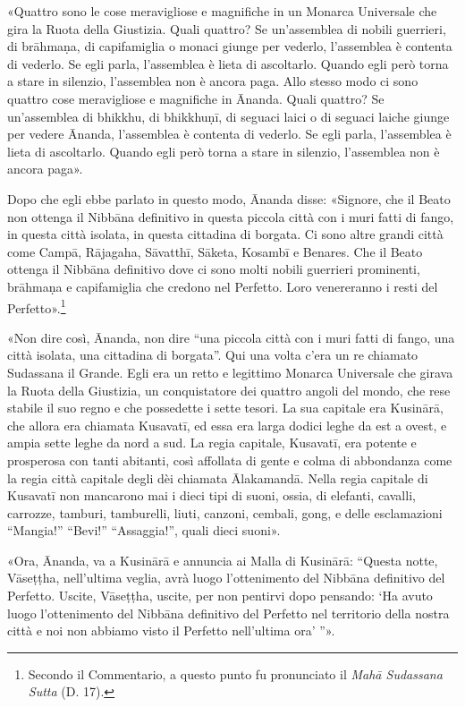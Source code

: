 

«Quattro sono le cose meravigliose e magnifiche in un Monarca Universale
che gira la Ruota della Giustizia. Quali quattro? Se un’assemblea di
nobili guerrieri, di brāhmaṇa, di capifamiglia o monaci giunge per
vederlo, l’assemblea è contenta di vederlo. Se egli parla, l’assemblea è
lieta di ascoltarlo. Quando egli però torna a stare in silenzio,
l’assemblea non è ancora paga. Allo stesso modo ci sono quattro cose
meravigliose e magnifiche in Ānanda. Quali quattro? Se un’assemblea di
bhikkhu, di bhikkhuṇī, di seguaci laici o di seguaci laiche giunge per
vedere Ānanda, l’assemblea è contenta di vederlo. Se egli parla,
l’assemblea è lieta di ascoltarlo. Quando egli però torna a stare in
silenzio, l’assemblea non è ancora paga».




Dopo che egli ebbe parlato in questo modo, Ānanda disse: «Signore, che
il Beato non ottenga il Nibbāna definitivo in questa piccola città con i
muri fatti di fango, in questa città isolata, in questa cittadina di
borgata. Ci sono altre grandi città come Campā, Rājagaha, Sāvatthī,
Sāketa, Kosambī e Benares. Che il Beato ottenga il Nibbāna definitivo
dove ci sono molti nobili guerrieri prominenti, brāhmaṇa e capifamiglia
che credono nel Perfetto. Loro venereranno i resti del
Perfetto».\footnote{Secondo il Commentario, a questo punto fu pronunciato il \emph{Mahā Sudassana Sutta} (D. 17).}


«Non dire così, Ānanda, non dire “una piccola città con i muri fatti di
fango, una città isolata, una cittadina di borgata”. Qui una volta c’era
un re chiamato Sudassana il Grande. Egli era un retto e legittimo
Monarca Universale che girava la Ruota della Giustizia, un conquistatore
dei quattro angoli del mondo, che rese stabile il suo regno e che
possedette i sette tesori. La sua capitale era Kusinārā, che allora era
chiamata Kusavatī, ed essa era larga dodici leghe da est a ovest, e
ampia sette leghe da nord a sud. La regia capitale, Kusavatī, era
potente e prosperosa con tanti abitanti, così affollata di gente e colma
di abbondanza come la regia città capitale degli dèi chiamata
Ālakamandā. Nella regia capitale di Kusavatī non mancarono mai i dieci
tipi di suoni, ossia, di elefanti, cavalli, carrozze, tamburi,
tamburelli, liuti, canzoni, cembali, gong, e delle esclamazioni
“Mangia!” “Bevi!” “Assaggia!”, quali dieci suoni».




«Ora, Ānanda, va a Kusinārā e annuncia ai Malla di Kusinārā: “Questa
notte, Vāseṭṭha, nell’ultima veglia, avrà luogo l’ottenimento del
Nibbāna definitivo del Perfetto. Uscite, Vāseṭṭha, uscite, per non
pentirvi dopo pensando: ‘Ha avuto luogo l’ottenimento del Nibbāna
definitivo del Perfetto nel territorio della nostra città e noi non
abbiamo visto il Perfetto nell’ultima ora’ ”».


